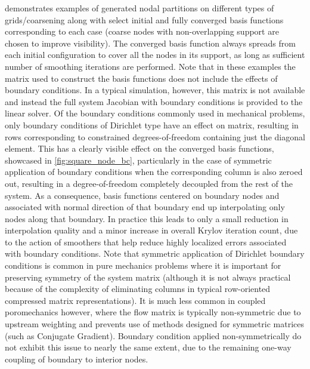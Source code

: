  demonstrates examples of generated nodal partitions on different types of grids/coarsening along with select initial and fully converged basis functions corresponding to each case (coarse nodes with non-overlapping support are chosen to improve visibility).   The converged basis function always spreads from each initial configuration to cover all the nodes in its support, as long as sufficient number of smoothing iterations are performed.   Note that in these examples the matrix used to construct the basis functions does not include the effects of boundary conditions.   In a typical simulation, however, this matrix is not available and instead the full system Jacobian with boundary conditions is provided to the linear solver.   Of the boundary conditions commonly used in mechanical problems, only boundary conditions of Dirichlet type have an effect on matrix, resulting in rows corresponding to constrained degrees-of-freedom containing just the diagonal element.   This has a clearly visible effect on the converged basis functions, showcased in \cref{fig:square_node_bc}, particularly in the case of symmetric application of boundary conditions when the corresponding column is also zeroed out, resulting in a degree-of-freedom completely decoupled from the rest of the system.   As a consequence, basis functions centered on boundary nodes and associated with normal direction of that boundary end up interpolating only nodes along that boundary.   In practice this leads to only a small reduction in interpolation quality and a minor increase in overall Krylov iteration count, due to the action of smoothers that help reduce highly localized  errors associated with boundary conditions.   Note that symmetric application of Dirichlet boundary conditions is common in pure mechanics problems where it is important for preserving symmetry of the system matrix (although it is not always practical because of the complexity of eliminating columns in typical row-oriented compressed matrix representations).   It is much less common in coupled poromechanics however, where the flow matrix is typically non-symmetric due to upstream weighting and prevents use of methods designed for symmetric matrices (such as Conjugate Gradient).   Boundary condition applied non-symmetrically do not exhibit this issue to nearly the same extent, due to the remaining one-way coupling of boundary to interior nodes.

